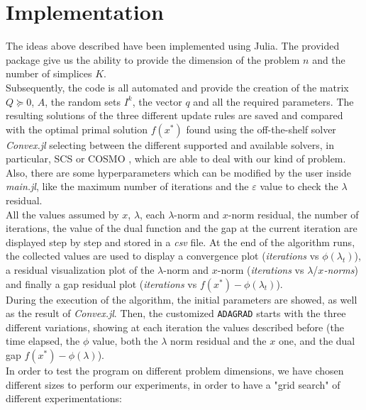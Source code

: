 \documentclass[notitlepage]{article}
\begin{document}
\section{Implementation}
The ideas above described have been implemented using Julia. The provided package give us the ability to provide the dimension of the problem $n$ and the number of simplices $K$.\\
Subsequently, the code is all automated and provide the creation of the matrix $Q \succeq 0$, $A$, the random sets $I^k$, the vector $q$ and all the required parameters. The resulting solutions 
of the three different update rules are saved and compared with the optimal primal solution $f(x^*)$ found using the off-the-shelf solver \textit{Convex.jl} \cite{DunningHuchetteLubin2017} selecting
between the different supported and available solvers, in particular, SCS \cite{ocpb:16} or COSMO \cite{Garstka_2021}, which are able to deal with our kind of problem.\\
Also, there are some hyperparameters which can be modified by the user inside \textit{main.jl}, like the maximum number of iterations and the $\varepsilon$ value to check the $\lambda$ residual.\\
All the values assumed by $x$, $\lambda$, each $\lambda$-norm and $x$-norm residual, the number of iterations, the value of the dual function and the gap at the current iteration are displayed 
step by step and stored in a \textit{csv} file. At the end of the algorithm runs, the collected values are used to display a convergence plot (\textit{iterations} vs $\phi(\lambda_t)$), a residual visualization plot of the 
$\lambda$-norm and $x$-norm (\textit{iterations} vs $\lambda$/$x$\textit{-norms}) and finally a gap residual plot (\textit{iterations} vs $f(x^*) - \phi(\lambda_t)$).\\
During the execution of the algorithm, the initial parameters are showed, as well as the result of \textit{Convex.jl}. Then, the customized \texttt{ADAGRAD} starts with the three different variations, 
showing at each iteration the values described before (the time elapsed, the $\phi$ value, both the $\lambda$ norm residual and the $x$ one, and the dual gap $f(x^*) - \phi(\lambda)$).\\
In order to test the program on different problem dimensions, we have chosen different sizes to perform our experiments, in order to have a "grid search" of different experimentations:
\end{document}
